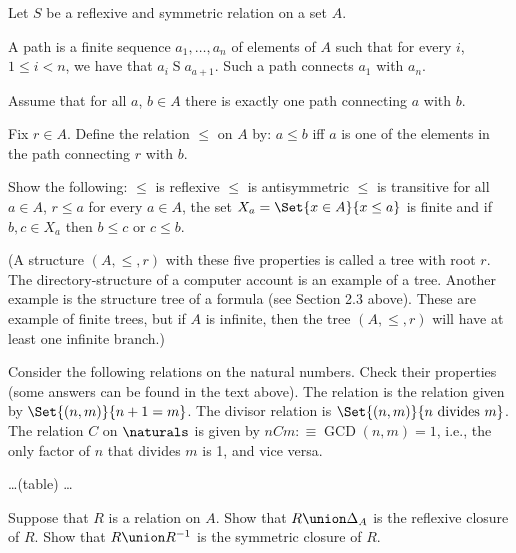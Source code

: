 \begin{Exercise} [number=32]
  
  Let $S$ be a reflexive and symmetric relation on a set $A$.

  A path is a finite sequence $a_1, \dots, a_n$ of elements of $A$
  such that for every $i$, $1 \le i < n$, we have that
  $a_{i}\mathrel{S}a_{a+1}$. Such a path connects $a_1$ with $a_n$.
  
  Assume that for all $a$, $b \in A$ there is exactly one path
  connecting $a$ with $b$.

  Fix $r \in A$. Define the relation $\le$ on $A$ by: $a \le b$ iff
  $a$ is one of the elements in the path connecting $r$ with $b$.

  Show the following:
  \Question $\le$ is reflexive
  \Question $\le$ is antisymmetric
  \Question $\le$ is transitive
  \Question for all $a \in A$, $r \le a$
  \Question for every $a \in A$, the set $X_a = \Set{x \in A}{x \le
    a}$ is finite and if $b,c \in X_a$ then $b \le c$ or $c \le b$.

  (A structure $(A,\le,r)$ with these five properties is called a
  tree with root $r$. The directory-structure of a computer account is
  an example of a tree. Another example is the structure tree of a
  formula (see Section 2.3 above). These are example of finite trees,
  but if $A$ is infinite, then the tree $(A,\le,r)$ will have at
  least one infinite branch.)
\end{Exercise}

\begin{Exercise} [number=33]
  Consider the following relations on the natural numbers. Check their
  properties (some answers can be found in the text above). The
   relation is the relation given by
  $\Set{(n,m)}{n+1=m}$. The divisor relation is $\Set{(n,m)}{n
    \textrm{ divides } m}$. The  relation $C$ on
  $\naturals$ is given by $nCm :\equiv \operatorname{GCD}(n,m) = 1$,
  i.e., the only factor of $n$ that divides $m$ is 1, and vice versa.

  \dots (table) \dots
\end{Exercise}

\begin{Exercise} [number=35]
  Suppose that $R$ is a relation on $A$.
  \Question Show that $R \union \Delta_A$ is the reflexive closure of
  $R$.
  \Question Show that $R \union R^{-1}$ is the symmetric closure of $R$.
\end{Exercise}

